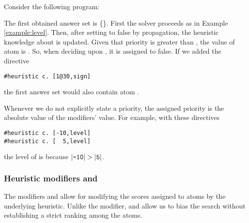 \begin{example}
\label{example:priority}
Consider the following program:

The first obtained answer set is \mbox{\{\}}.
First the solver proceeds as in Example \ref{example:level}. 
Then, after setting  to false by propagation, 
the heuristic knowledge about  is updated.
Given that priority  is greater than ,
the  value of atom  is .
So, when deciding upon , it is assigned to false.
If we added the directive
\begin{lstlisting}[numbers=none]
#heuristic c. [1@30,sign]
\end{lstlisting}
the first answer set would also contain atom .
\end{example}

\begin{note}
Whenever we do not explicitly state a priority,
the assigned priority is the absolute value of the modifiers' value.
For example, 
with these directives
\begin{lstlisting}[numbers=none]
#heuristic c. [-10,level]
#heuristic c. [  5,level]
\end{lstlisting}
the level of  is  because $|\code{-10}|>|\code{5}|$.
\end{note}

\subsubsection{Heuristic modifiers  and }

The modifiers  and  allow for modifying the scores assigned to atoms by the underlying  heuristic.
Unlike the  modifier, 
 and  allow us to bias the search without establishing a strict ranking among the atoms.

